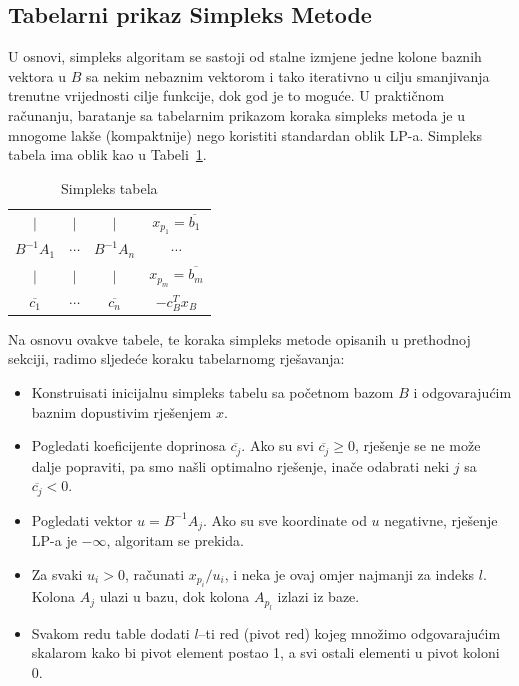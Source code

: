 \documentclass[a4paper, utf8, 11pt, colorlinks]{article}
\begin{document}
\subsection{Tabelarni prikaz Simpleks Metode}

U osnovi, simpleks algoritam se sastoji od stalne izmjene jedne kolone baznih vektora u $B$ sa nekim nebaznim vektorom i tako iterativno u cilju smanjivanja trenutne vrijednosti cilje funkcije, dok god je to moguće. 
U praktičnom računanju, baratanje sa tabelarnim prikazom koraka simpleks metoda je u mnogome lakše (kompaktnije) nego koristiti standardan oblik LP-a. 
Simpleks tabela ima oblik kao u Tabeli~\ref{tab:simplex_tabelau}. 

\begin{table}[!ht]
    \centering
    \begin{tabular}{c c c | c} \\ \hline
            $\mid$          &       $\mid$ &  $\mid$             &    $x_{p_1} = \overline{b_1}$         \\
          $B^{-1}A_1$       &    $\cdots$    &  $B^{-1}A_n$      &    $\cdots$          \\
            $\mid$          &       $\mid$ &  $\mid$             &   $ x_{p_m} = \overline{b_m}$         \\ \hline
          $\overline{c_1}$  &    $\cdots$    & $\overline{c_n}$  &  $-c^T_B x_B$         \\ \hline
    \end{tabular}
    \caption{Simpleks tabela}
    \label{tab:simplex_tabelau}
\end{table}

Na osnovu ovakve tabele, te koraka simpleks metode opisanih u prethodnoj sekciji, radimo sljedeće koraku tabelarnomg rješavanja:
\begin{itemize}
    \item Konstruisati inicijalnu simpleks tabelu sa početnom bazom $B$ i odgovarajućim baznim dopustivim rješenjem $x$.
    \item Pogledati koeficijente doprinosa $\overline{c_j}$. Ako su svi $\overline{c_j} \geq 0$, rješenje se ne može dalje popraviti, pa smo našli optimalno rješenje, inače odabrati neki $j$ sa $\overline{c_j}<0$.
    \item Pogledati vektor $u = B^{-1}A_j$. Ako su sve koordinate od $u$ negativne, rješenje LP-a je $-\infty$, algoritam se prekida.
    \item Za svaki $u_i > 0$, računati $x_{p_i}/u_i$, i neka je ovaj omjer najmanji za indeks $l$. Kolona $A_{j}$ ulazi u bazu, dok kolona $A_{p_l}$ izlazi iz baze. 
    \item Svakom redu table dodati $l$--ti red (pivot red) kojeg množimo odgovarajućim
         skalarom kako bi pivot element postao 1, a svi ostali elementi u pivot koloni 0.
\end{itemize}
\end{document}
